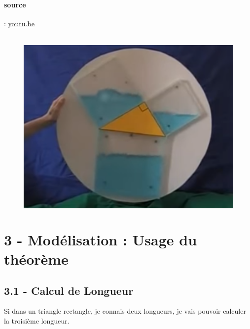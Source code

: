 \documentclass[12pt]{article}
\begin{document}
\paragraph{source} : \url{youtu.be}

  \begin{figure}[H]
        \centering
        \includegraphics[width=0.4\linewidth]{3x6-pythagore/sources/pyth.png}
  \end{figure}

\section*{3 - Modélisation : Usage du théorème}

\subsection*{3.1 - Calcul de Longueur}

Si dans un triangle rectangle, je connais deux longueurs, je vais pouvoir calculer la troisième longueur.
\end{document}
